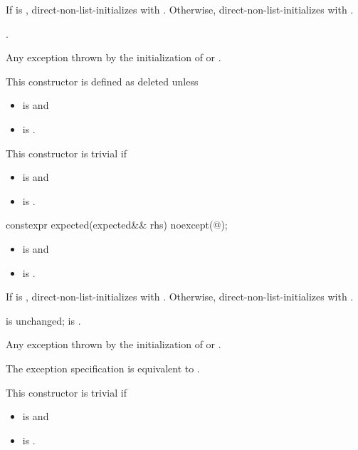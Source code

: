 \begin{itemdescr}
\pnum
\effects
If  is ,
direct-non-list-initializes  with .
Otherwise, direct-non-list-initializes  with .

\pnum
\ensures
{}.

\pnum
\throws
Any exception thrown by the initialization of  or .

\pnum
\remarks
This constructor is defined as deleted unless
\begin{itemize}
\item
{} is  and
\item
{} is .
\end{itemize}

\pnum
This constructor is trivial if
\begin{itemize}
\item
{} is  and
\item
{} is .
\end{itemize}
\end{itemdescr}

%
\begin{itemdecl}
constexpr expected(expected&& rhs) noexcept(@\seebelow@);
\end{itemdecl}

\begin{itemdescr}
\pnum
\constraints
\begin{itemize}
\item
{} is  and
\item
{} is .
\end{itemize}

\pnum
\effects
If  is ,
direct-non-list-initializes  with .
Otherwise,
direct-non-list-initializes  with .

\pnum
\ensures
{} is unchanged;
 is .

\pnum
\throws
Any exception thrown by the initialization of  or .

\pnum
\remarks
The exception specification is equivalent to
.

\pnum
This constructor is trivial if
\begin{itemize}
\item
{} is  and
\item
{} is .
\end{itemize}
\end{itemdescr}

